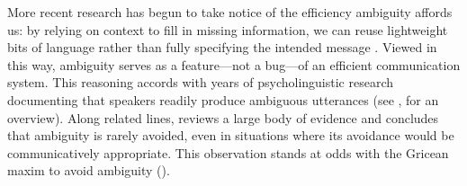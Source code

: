 \documentclass[10pt,a4paper]{article}
\begin{document}
More recent research has begun to take notice of the efficiency ambiguity affords us: by relying on context to fill in missing information, we can reuse lightweight bits of language rather than fully specifying the intended message \cite{levinson2000,piantadosietal2012,wasow2015}. 
Viewed in this way, ambiguity serves as a feature---not a bug---of an efficient communication system.
This reasoning accords with years of psycholinguistic research documenting that speakers readily produce ambiguous utterances (see , for an overview). 
Along related lines,  reviews a large body of evidence and concludes that ambiguity is rarely avoided, even in situations where its avoidance would be communicatively appropriate.
This observation stands at odds with the Gricean maxim to avoid ambiguity ().
\end{document}
